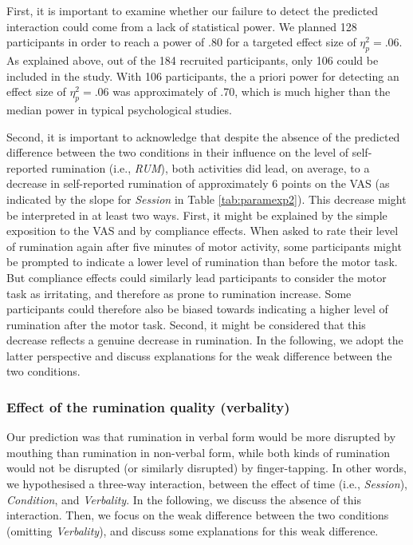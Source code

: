\documentclass[a4paper,12pt,twoside,openright,oldfontcommands]{memoir}
\begin{document}
First, it is important to examine whether our failure to detect the predicted interaction could come from a lack of statistical power. We planned 128 participants in order to reach a power of .80 for a targeted effect size of \(\eta_{p}^{2}=.06\). As explained above, out of the 184 recruited participants, only 106 could be included in the study. With 106 participants, the a priori power for detecting an effect size of \(\eta_{p}^{2}=.06\) was approximately of .70, which is much higher than the median power in typical psychological studies.

Second, it is important to acknowledge that despite the absence of the predicted difference between the two conditions in their influence on the level of self-reported rumination (i.e., \emph{RUM}), both activities did lead, on average, to a decrease in self-reported rumination of approximately 6 points on the VAS (as indicated by the slope for \emph{Session} in Table \ref{tab:paramexp2}). This decrease might be interpreted in at least two ways. First, it might be explained by the simple exposition to the VAS and by compliance effects. When asked to rate their level of rumination again after five minutes of motor activity, some participants might be prompted to indicate a lower level of rumination than before the motor task. But compliance effects could similarly lead participants to consider the motor task as irritating, and therefore as prone to rumination increase. Some participants could therefore also be biased towards indicating a higher level of rumination after the motor task. Second, it might be considered that this decrease reflects a genuine decrease in rumination. In the following, we adopt the latter perspective and discuss explanations for the weak difference between the two conditions.

\hypertarget{effect-of-the-rumination-quality-verbality}{%
\subsubsection{Effect of the rumination quality (verbality)}\label{effect-of-the-rumination-quality-verbality}}

Our prediction was that rumination in verbal form would be more disrupted by mouthing than rumination in non-verbal form, while both kinds of rumination would not be disrupted (or similarly disrupted) by finger-tapping. In other words, we hypothesised a three-way interaction, between the effect of time (i.e., \emph{Session}), \emph{Condition}, and \emph{Verbality}. In the following, we discuss the absence of this interaction. Then, we focus on the weak difference between the two conditions (omitting \emph{Verbality}), and discuss some explanations for this weak difference.
\end{document}
